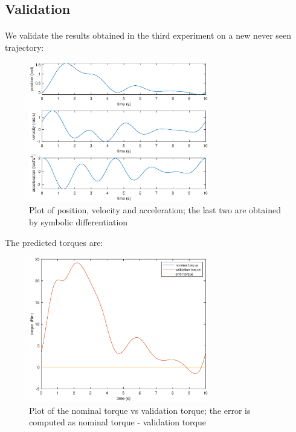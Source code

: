\documentclass{article}
\begin{document}
\pagebreak

\subsection{Validation} \paragraph{} We validate the results obtained in the third experiment on a new never seen trajectory:

\begin{figure}[!htbp]
\centering
\includegraphics[width=0.7\textwidth]{images/1-dof/validation_trajectory.eps}
\caption{Plot of position, velocity and acceleration; the last two are obtained by symbolic differentiation}
\end{figure}
\FloatBarrier

The predicted torques are:

\begin{figure}[!htbp]
\centering
\includegraphics[width=0.7\textwidth]{images/1-dof/validation.eps}
\caption{Plot of the nominal torque vs validation torque; the error is computed as nominal torque - validation torque}
\end{figure}
\FloatBarrier
\end{document}
